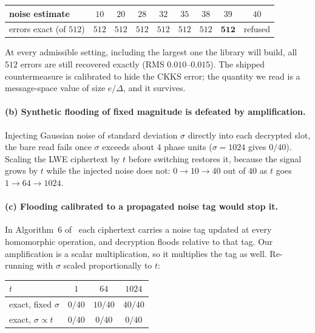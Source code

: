 \documentclass[11pt]{article}
\begin{document}
\begin{table}[h]
\centering
\begin{tabular}{lcccccccc}
\toprule
noise estimate & $10$ & $20$ & $28$ & $32$ & $35$ & $38$ & $39$ & $40$ \\
\midrule
errors exact (of $512$) & $512$ & $512$ & $512$ & $512$ & $512$ & $512$ & $\mathbf{512}$ & refused \\
\bottomrule
\end{tabular}
\end{table}

At every admissible setting, including the largest one the library will build, all $512$ errors are
still recovered exactly (RMS $0.010$--$0.015$). The shipped countermeasure is calibrated to hide
the CKKS error; the quantity we read is a message-space value of size $e/\Delta$, and it survives.

\paragraph{(b) Synthetic flooding of fixed magnitude is defeated by amplification.}
Injecting Gaussian noise of standard deviation $\sigma$ directly into each decrypted slot, the bare
read fails once $\sigma$ exceeds about $4$ phase units ($\sigma = 1024$ gives $0/40$). Scaling the
LWE ciphertext by $t$ before switching restores it, because the signal grows by $t$ while the
injected noise does not: $0 \to 10 \to 40$ out of $40$ as $t$ goes $1 \to 64 \to 1024$.

\paragraph{(c) Flooding calibrated to a propagated noise tag would stop it.}
In Algorithm~6 of~\cite{santato2026} each ciphertext carries a noise tag updated at every
homomorphic operation, and decryption floods relative to that tag. Our amplification is a scalar
multiplication, so it multiplies the tag as well. Re-running with $\sigma$ scaled proportionally to
$t$:

\begin{table}[h]
\centering
\begin{tabular}{lccc}
\toprule
$t$ & $1$ & $64$ & $1024$ \\
\midrule
exact, fixed $\sigma$     & $0/40$ & $10/40$ & $40/40$ \\
exact, $\sigma \propto t$ & $0/40$ & $0/40$  & $0/40$ \\
\bottomrule
\end{tabular}
\end{table}
\end{document}
